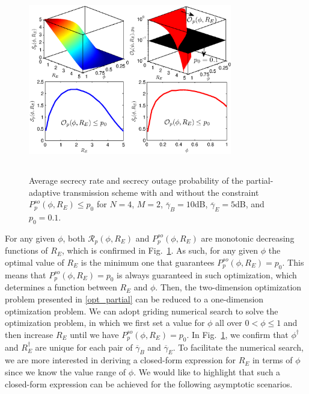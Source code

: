 \documentclass[journal]{IEEEtran}
\begin{document}
\begin{figure}[!t]
    \begin{center}
   {\includegraphics[width=3.5in, height=2.9in]{partial_opt_nogrid.eps}}
    \caption{Average secrecy rate and secrecy outage probability of the partial-adaptive transmission scheme with and without the constraint $P^{so}_p(\phi, R_E) \leq p_0$ for $N = 4$, $M =2$, $\overline{\gamma}_B = 10$dB, $\overline{\gamma}_E = 5$dB, and $p_0 = 0.1$. }\label{fig:opt_partial}
    \end{center}
\end{figure}


For any given $\phi$, both $\mathcal{R}_p (\phi, R_E)$ and $P^{so}_p(\phi, R_E)$ are monotonic decreasing functions of $R_E$, which is confirmed in Fig.~\ref{fig:opt_partial}. As such, for any given $\phi$ the optimal value of $R_E$ is the minimum one that guarantees $P^{so}_p(\phi, R_E) = p_0$. This means that $P^{so}_p(\phi, R_E) = p_0$ is always guaranteed in such optimization, which determines a function between $R_E$ and $\phi$. Then, the two-dimension optimization problem presented in \eqref{opt_partial} can be reduced to a one-dimension optimization problem. We can adopt griding numerical search to solve the optimization problem, in which we first set a value for $\phi$ all over $0< \phi \leq 1$ and then increase $R_E$ until we have $P^{so}_p(\phi, R_E) = p_0$. In Fig.~\ref{fig:opt_partial}, we confirm that $\phi^{\dag}$ and $R_E^{\dag}$ are unique for each pair of $\overline{\gamma}_B$ and $\overline{\gamma}_E$. To facilitate the numerical search, we are more interested in deriving a closed-form expression for $R_E$ in terms of $\phi$ since we know the value range of $\phi$. We would like to highlight that such a closed-form expression can be achieved for the following asymptotic scenarios.
\end{document}
